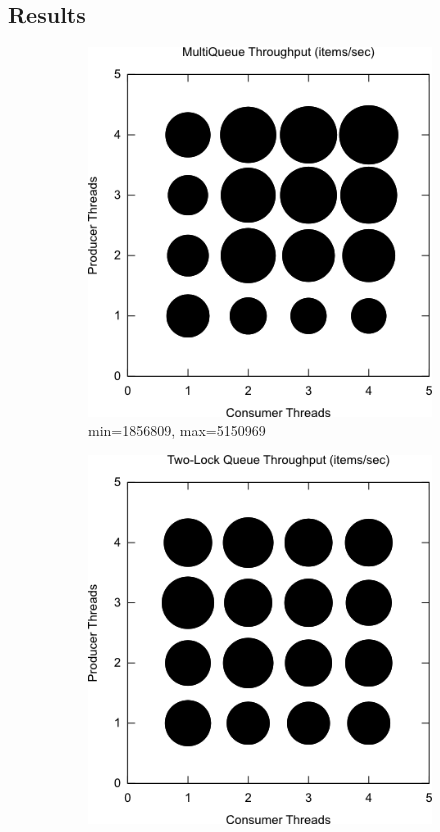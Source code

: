 \documentclass[12pt]{report}
\begin{document}
\subsection{Results}
\begin{figure}[H]
    \centering
    \begin{subfigure}[b]{0.45\textwidth}
        \centering
        \includegraphics[width=\textwidth]{multiqueue.png}
        \caption{min=1856809, max=5150969}
    \end{subfigure}
    \hfill
    \begin{subfigure}[b]{0.45\textwidth}
        \centering
        \includegraphics[width=\textwidth]{two-lock.png}

\end{subfigure}
\end{figure}
\end{document}
